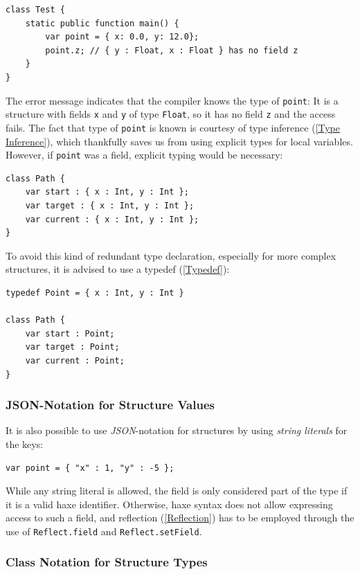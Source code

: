 \documentclass{article}
\newcommand{\type}[1]{\texttt{#1}}
\newcommand{\expr}[1]{\texttt{#1}}
\newcommand{\tref}[2]{#1 (\ref{#2})}
\begin{document}
\begin{lstlisting}
class Test {
	static public function main() {
		var point = { x: 0.0, y: 12.0};
		point.z; // { y : Float, x : Float } has no field z
	}
}
\end{lstlisting}
The error message indicates that the compiler knows the type of \expr{point}: It is a structure with fields \expr{x} and \expr{y} of type \type{Float}, so it has no field \expr{z} and the access fails.
The fact that type of \expr{point} is known is courtesy of \tref{type inference}{Type Inference}, which thankfully saves us from using explicit types for local variables. However, if \expr{point} was a field, explicit typing would be necessary:

\begin{lstlisting}
class Path {
    var start : { x : Int, y : Int };
    var target : { x : Int, y : Int };
    var current : { x : Int, y : Int };
}
\end{lstlisting}
To avoid this kind of redundant type declaration, especially for more complex structures, it is advised to use a \tref{typedef}{Typedef}:

\begin{lstlisting}
typedef Point = { x : Int, y : Int }

class Path {
    var start : Point;
    var target : Point;
    var current : Point;
}
\end{lstlisting}


\subsubsection{JSON-Notation for Structure Values}
\label{JSON-Notation for Structure Values}

It is also possible to use \emph{JSON}-notation for structures by using \emph{string literals} for the keys:

\begin{lstlisting}
var point = { "x" : 1, "y" : -5 };
\end{lstlisting}
While any string literal is allowed, the field is only considered part of the type if it is a valid haxe identifier. Otherwise, haxe syntax does not allow expressing access to such a field, and \tref{reflection}{Reflection} has to be employed through the use of \expr{Reflect.field} and \expr{Reflect.setField}.


\subsubsection{Class Notation for Structure Types}
\label{Class Notation for Structure Types}
\end{document}
